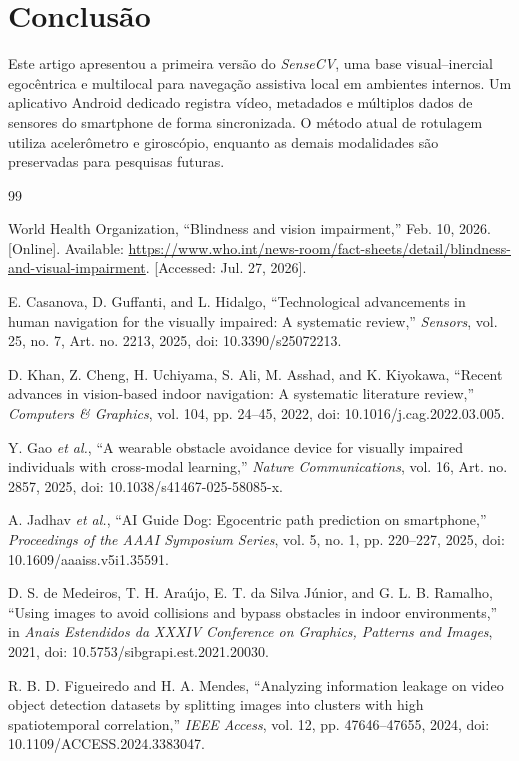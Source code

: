 \documentclass[conference]{IEEEtran}
\newcommand{\sensecv}{\textit{SenseCV}}
\begin{document}
\section{Conclusão}
Este artigo apresentou a primeira versão do \sensecv, uma base visual--inercial egocêntrica e multilocal para navegação assistiva local em ambientes internos. Um aplicativo Android dedicado registra vídeo, metadados e múltiplos dados de sensores do smartphone de forma sincronizada. O método atual de rotulagem utiliza acelerômetro e giroscópio, enquanto as demais modalidades são preservadas para pesquisas futuras. 

\begin{thebibliography}{99}

World Health Organization,
``Blindness and vision impairment,''
Feb. 10, 2026. [Online]. Available:
\url{https://www.who.int/news-room/fact-sheets/detail/blindness-and-visual-impairment}.
[Accessed: Jul. 27, 2026].

E. Casanova, D. Guffanti, and L. Hidalgo,
``Technological advancements in human navigation for the visually
impaired: A systematic review,''
\emph{Sensors}, vol. 25, no. 7, Art. no. 2213, 2025,
doi: 10.3390/s25072213.

D. Khan, Z. Cheng, H. Uchiyama, S. Ali, M. Asshad, and
K. Kiyokawa,
``Recent advances in vision-based indoor navigation: A systematic
literature review,''
\emph{Computers \& Graphics}, vol. 104, pp. 24--45, 2022,
doi: 10.1016/j.cag.2022.03.005.

Y. Gao \emph{et al.},
``A wearable obstacle avoidance device for visually impaired
individuals with cross-modal learning,''
\emph{Nature Communications}, vol. 16, Art. no. 2857, 2025,
doi: 10.1038/s41467-025-58085-x.

A. Jadhav \emph{et al.},
``AI Guide Dog: Egocentric path prediction on smartphone,''
\emph{Proceedings of the AAAI Symposium Series},
vol. 5, no. 1, pp. 220--227, 2025,
doi: 10.1609/aaaiss.v5i1.35591.

D. S. de Medeiros, T. H. Araújo, E. T. da Silva Júnior,
and G. L. B. Ramalho,
``Using images to avoid collisions and bypass obstacles in indoor
environments,''
in \emph{Anais Estendidos da XXXIV Conference on Graphics,
Patterns and Images}, 2021,
doi: 10.5753/sibgrapi.est.2021.20030.

R. B. D. Figueiredo and H. A. Mendes,
``Analyzing information leakage on video object detection datasets
by splitting images into clusters with high spatiotemporal
correlation,''
\emph{IEEE Access}, vol. 12, pp. 47646--47655, 2024,
doi: 10.1109/ACCESS.2024.3383047.


\end{thebibliography}
\end{document}
